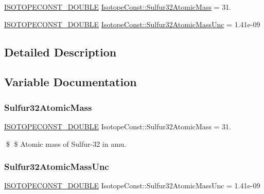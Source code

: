 \begin{DoxyCompactItemize}
\item 
\mbox{\hyperlink{group___isotope_const-_macros_ga8f45a7272ce02c0b4c65c44636ed719a}{I\+S\+O\+T\+O\+P\+E\+C\+O\+N\+S\+T\+\_\+\+D\+O\+U\+B\+LE}} \mbox{\hyperlink{group___isotope_const-_sulfur-_s32_gacbef686bdcb109362156785835e41bd0}{Isotope\+Const\+::\+Sulfur32\+Atomic\+Mass}} = 31.
\item 
\mbox{\hyperlink{group___isotope_const-_macros_ga8f45a7272ce02c0b4c65c44636ed719a}{I\+S\+O\+T\+O\+P\+E\+C\+O\+N\+S\+T\+\_\+\+D\+O\+U\+B\+LE}} \mbox{\hyperlink{group___isotope_const-_sulfur-_s32_gab9906aedd08cfd463ff7235163745ecd}{Isotope\+Const\+::\+Sulfur32\+Atomic\+Mass\+Unc}} = 1.\+41e-\/09
\end{DoxyCompactItemize}


\subsection{Detailed Description}


\subsection{Variable Documentation}
\mbox{\label{group___isotope_const-_sulfur-_s32_gacbef686bdcb109362156785835e41bd0}} 
\subsubsection{\texorpdfstring{Sulfur32\+Atomic\+Mass}{Sulfur32AtomicMass}}
{\footnotesize\ttfamily \mbox{\hyperlink{group___isotope_const-_macros_ga8f45a7272ce02c0b4c65c44636ed719a}{I\+S\+O\+T\+O\+P\+E\+C\+O\+N\+S\+T\+\_\+\+D\+O\+U\+B\+LE}} Isotope\+Const\+::\+Sulfur32\+Atomic\+Mass = 31.}

\$ \$ Atomic mass of Sulfur-\/32 in amu. \mbox{\label{group___isotope_const-_sulfur-_s32_gab9906aedd08cfd463ff7235163745ecd}} 
\subsubsection{\texorpdfstring{Sulfur32\+Atomic\+Mass\+Unc}{Sulfur32AtomicMassUnc}}
{\footnotesize\ttfamily \mbox{\hyperlink{group___isotope_const-_macros_ga8f45a7272ce02c0b4c65c44636ed719a}{I\+S\+O\+T\+O\+P\+E\+C\+O\+N\+S\+T\+\_\+\+D\+O\+U\+B\+LE}} Isotope\+Const\+::\+Sulfur32\+Atomic\+Mass\+Unc = 1.\+41e-\/09}

